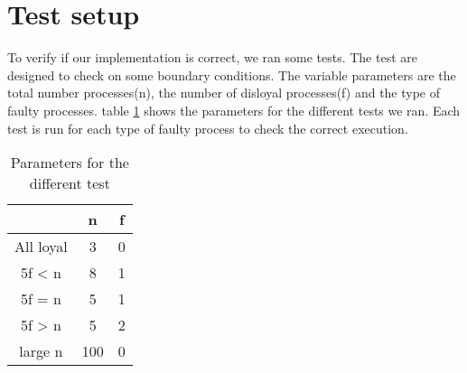 \section{Test setup}

To verify if our implementation is correct, we ran some tests.
The test are designed to check on some boundary conditions.
The variable parameters are the total number processes(n), the number of disloyal processes(f) and the type of faulty processes.
table \ref{table:Tests} shows the parameters for the different tests we ran. Each test is run for each type of faulty process to check the correct execution.

\begin{table}[h]
	\begin{tabular}{ | c | c  | c  | }
		\hline
  		& n & f \\
		\hline
 		All loyal &  3 & 0  \\
		\hline
  		5f < n  & 8 & 1  \\
		\hline
		5f = n & 5 & 1 \\
		\hline
		5f > n & 5 & 2 \\
		\hline
		large n  & 100 & 0 \\
		\hline
	\end{tabular}
	\caption{Parameters for the different test}	
	\label{table:Tests}
\end{table}
